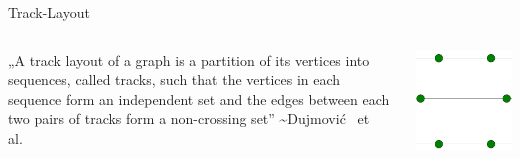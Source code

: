 \documentclass[hyperref={pdfpagelabels=false},aspectratio=169]{beamer}
\theoremstyle{definition}
\begin{document}
\begin{frame}{Track-Layout}
    \begin{columns}
        \begin{column}{0.5\textwidth}
            „A track layout of a graph is a partition of its vertices into sequences, called tracks, such that the vertices in each sequence form an independent set and the edges between each two pairs of tracks form a non-crossing set” \sim Dujmović \, et \, al.
        \end{column}
        \begin{column}{0.5\textwidth}
            \includegraphics[scale=0.7]{img/octahedron_tlp_3_tracks.png}
        \end{column}
    \end{columns}
\end{frame}
\end{document}
